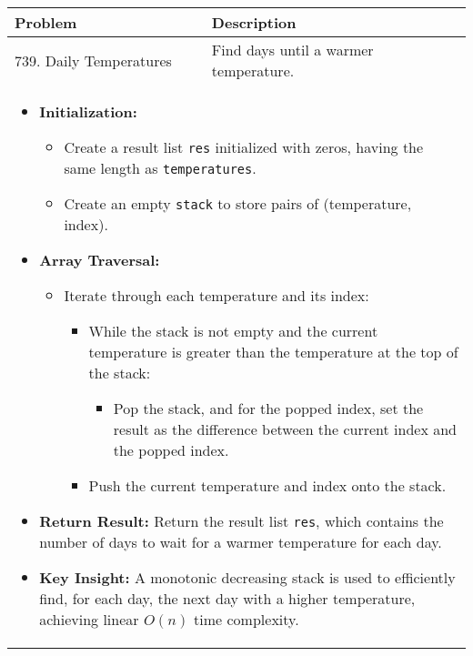 \begin{summary}
    \begin{center}
        \begin{tabular}{ll}
            \toprule
            \textbf{Problem} & \textbf{Description} \\
            \midrule     
            739. Daily Temperatures & Find days until a warmer temperature. \\
            \multicolumn{2}{p{\linewidth}}{
                \begin{itemize}
                    \item \textbf{Initialization:}
                    \begin{itemize}
                        \item Create a result list \texttt{res} initialized with zeros, having the same length as \texttt{temperatures}.
                        \item Create an empty \texttt{stack} to store pairs of (temperature, index).
                    \end{itemize}
                
                    \item \textbf{Array Traversal:}
                    \begin{itemize}
                        \item Iterate through each temperature and its index:
                        \begin{itemize}
                            \item While the stack is not empty and the current temperature is greater than the temperature at the top of the stack:
                            \begin{itemize}
                                \item Pop the stack, and for the popped index, set the result as the difference between the current index and the popped index.
                            \end{itemize}
                            \item Push the current temperature and index onto the stack.
                        \end{itemize}
                    \end{itemize}
                
                    \item \textbf{Return Result:} Return the result list \texttt{res}, which contains the number of days to wait for a warmer temperature for each day.
                
                    \item \textbf{Key Insight:} A monotonic decreasing stack is used to efficiently find, for each day, the next day with a higher temperature, achieving linear $O(n)$ time complexity.
                \end{itemize}                           
            } \\
            \midrule               
            \bottomrule
        \end{tabular}
    \end{center}
\end{summary}
\newpage

